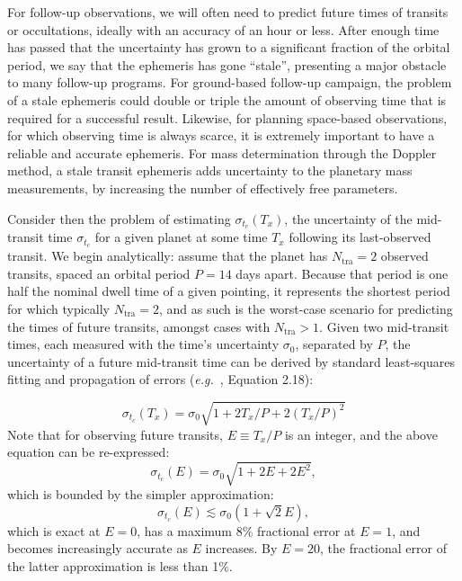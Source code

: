 For follow-up observations, we will often need to predict future times
of transits or occultations, ideally with an accuracy of an hour or
less. After enough time has passed that the uncertainty has grown to a
significant fraction of the orbital period, we say that the ephemeris
has gone ``stale'', presenting a major obstacle to many follow-up
programs. For \tesss ground-based follow-up campaign, the problem of a
stale ephemeris could double or triple the amount of observing time
that is required for a successful result.  Likewise, for planning
space-based observations, for which observing time is always scarce,
it is extremely important to have a reliable and accurate ephemeris.
For mass determination through the Doppler method, a stale transit
ephemeris adds uncertainty to the planetary mass measurements, by
increasing the number of effectively free parameters.

Consider then the problem of estimating $\sigma_{t_c}(T_x)$, the
uncertainty of the mid-transit time $\sigma_{t_c}$ for a given planet
at some time $T_x$ following its last-observed transit.  We begin
analytically: assume that the planet has $N_\mathrm{tra}=2$ observed
transits, spaced an orbital period $P=14$ days apart. Because that
period is one half the nominal \tess dwell time of a given pointing,
it represents the shortest period for which typically
$N_\mathrm{tra}=2$, and as such is the worst-case scenario for predicting
the times of future transits, amongst cases with $N_\mathrm{tra}>1$.
Given two mid-transit times, each measured with the time's uncertainty
$\sigma_0$, separated by $P$, the uncertainty of a future mid-transit
time can be derived by standard least-squares fitting and propagation
of errors (\textit{e.g.}~\citet{lyons_practical_1991}, Equation 2.18):

\begin{equation}
	\sigma_{t_c}(T_x) = \sigma_0 \sqrt{1 + 2 T_x / P + 2 (T_x / P)^2 }
\end{equation}
Note that for observing future transits, $E \equiv T_x / P$ is an integer, and the above equation can be re-expressed:
\begin{equation}
	\sigma_{t_c}(E) = \sigma_0 \sqrt{1 + 2 E + 2 E^2 },
\end{equation}
which is bounded by the simpler approximation: 
\begin{equation}
	\sigma_{t_c}(E) \lesssim \sigma_0 \left(1+\sqrt{2} E\right), 
\end{equation}
which is exact at $E=0$, has a maximum 8\% fractional error at $E=1$, and becomes increasingly accurate as $E$ increases. By $E=20$, the fractional error of the latter approximation is less than 1\%.

